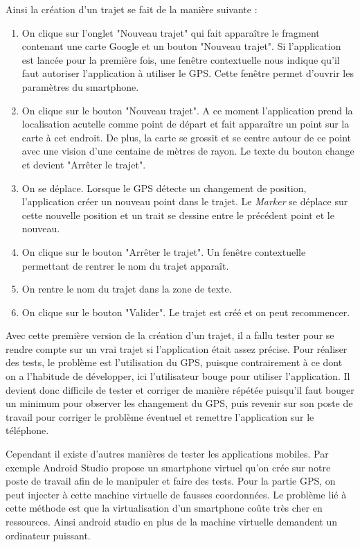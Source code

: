 Ainsi la création d'un trajet se fait de la manière suivante :
\begin{enumerate}
  \item On clique sur l'onglet "Nouveau trajet" qui fait apparaître le fragment contenant une carte Google et un bouton "Nouveau trajet".
  Si l'application est lancée pour la première fois, une fenêtre contextuelle nous indique qu'il faut autoriser l'application à utiliser le GPS.
  Cette fenêtre permet d'ouvrir les paramètres du smartphone.
  \item On clique sur le bouton "Nouveau trajet". A ce moment l'application prend la localisation acutelle comme point de départ et fait
  apparaître un point sur la carte à cet endroit. De plus, la carte se grossit et se centre autour de ce point avec une vision d'une centaine de mètres de rayon. Le texte du bouton change et devient "Arrêter le trajet".
  \item On se déplace. Lorsque le GPS détecte un changement de position, l'application créer un nouveau point dans le trajet. Le \emph{Marker}
  se déplace sur cette nouvelle position et un trait se dessine entre le précédent point et le nouveau.
  \item On clique sur le bouton "Arrêter le trajet". Un fenêtre contextuelle permettant de rentrer le nom du trajet apparaît.
  \item On rentre le nom du trajet dans la zone de texte.
  \item On clique sur le bouton "Valider". Le trajet est créé et on peut recommencer.
\end{enumerate}
\vspace{10pt}

Avec cette première version de la création d'un trajet, il a fallu tester pour se rendre compte sur un vrai trajet si l'application était
assez précise. Pour réaliser des tests, le problème est l'utilisation du GPS, puisque contrairement à ce dont on a l'habitude de développer,
ici l'utilisateur bouge pour utiliser l'application. Il devient donc difficile de tester et corriger de manière répétée puisqu'il faut bouger
un minimum pour observer les changement du GPS, puis revenir sur son poste de travail pour corriger le problème éventuel et remettre
l'application sur le téléphone.

Cependant il existe d'autres manières de tester les applications mobiles. Par exemple Android Studio propose
un smartphone virtuel qu'on crée sur notre poste de travail afin de le manipuler et faire des tests. Pour la partie GPS, on peut injecter
à cette machine virtuelle de fausses coordonnées. Le problème lié à cette méthode est que la virtualisation d'un smartphone coûte très cher
en ressources. Ainsi android studio en plus de la machine virtuelle demandent un ordinateur puissant.

